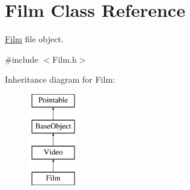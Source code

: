 \hypertarget{classFilm}{\section{Film Class Reference}
\label{classFilm}
}


\hyperlink{classFilm}{Film} file object.  




{\ttfamily \#include $<$Film.\-h$>$}

Inheritance diagram for Film\-:\begin{figure}[H]
\begin{center}
\leavevmode
\includegraphics[height=4.000000cm]{classFilm}
\end{center}
\end{figure}

